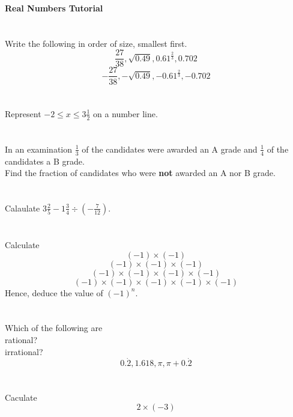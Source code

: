 \documentclass[a4paper]{article}
\begin{document}
\begin{center}
    \bf Real Numbers Tutorial
\end{center}
\section{}
Write the following in order of size, smallest first.
\[\frac{27}{38},\sqrt{0.49},0.61^{\frac23},0.702\]
\[-\frac{27}{38},-\sqrt{0.49},-0.61^{\frac23},-0.702\]
\section{}
Represent \(-2\leqslant x\leqslant 3\frac12\) on a number line.
\section{}
In an examination \(\frac13\) of the candidates were awarded an A grade and \(\frac14\) of the candidates a B grade.\\
Find the fraction of candidates who were {\bf not} awarded an A nor B grade.
\section{}
Calaulate \(3\frac25-1\frac34\div\left(-\frac7{12}\right)\).
\section{}
Calculate
\[(-1)\times(-1)\]
\[(-1)\times(-1)\times(-1)\]
\[(-1)\times(-1)\times(-1)\times(-1)\]
\[(-1)\times(-1)\times(-1)\times(-1)\times(-1)\]
Hence, deduce the value of \((-1)^n\).
\section{}
Which of the following are\\
rational?\\
irrational?
\[0.\dot2,1.618,\pi,\pi+0.\dot2\]
\section{}
Caculate
\[2\times(-3)\]
\end{document}
